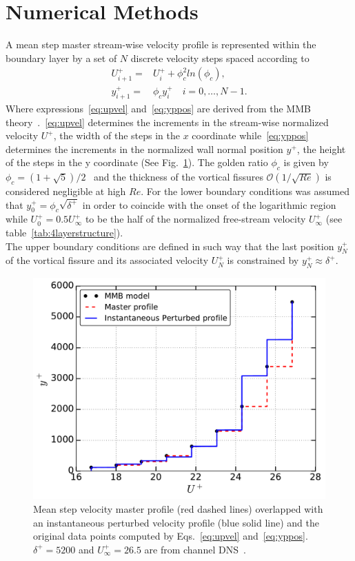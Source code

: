 \documentclass[aps,reprint,amsmath,amssymb,pra,floatfix]{revtex4-1}%
\begin{document}
\section{\label{sec:nm} Numerical Methods}
A  mean step master stream-wise velocity profile is represented within the boundary layer by a set of $N$ discrete velocity steps spaced according to  
\begin{align}
U^+_{i+1}=&U^+_i+\phi_c^2 ln(\phi_c) \label{eq:upvel},\\
y^+_{i+1}=&\phi_c y^+_i\quad i=0,\ldots ,N-1. \label{eq:yppos}
\end{align}
Where expressions~\eqref{eq:upvel} and~\eqref{eq:yppos} are derived from the MMB theory~\citep{Klewickimmb}.~\eqref{eq:upvel} determines the increments in the stream-wise normalized velocity $U^+$, the width of the steps in the $x$ coordinate while~\eqref{eq:yppos} determines the increments in the normalized wall normal position $y^+$, the height of the steps in the y coordinate (See Fig.~\ref{fig:master_profile}). The golden ratio $\phi_c$ is given by $\phi_c=(1+\sqrt{5})/2$~\cite{klewicki2014} and the thickness of the
vortical fissures $\mathcal{O}(1/\sqrt{Re})$ is considered negligible at high $Re$. For the lower boundary conditions was assumed that $y^+_0=\phi_c\sqrt{\delta^+}$ in order to coincide with the onset of the logarithmic region  while $U^+_0=0.5 U_{\infty}^+$ to be the half of the normalized free-stream velocity $U_{\infty}^+$ (see table~\ref{tab:4layerstructure}). \\  
The upper boundary conditions are defined in such way that the last position $y_{N}^+$ of the vortical fissure and its associated velocity $U^+_{N}$ is constrained by $y_{N}^+\approx\delta^+$.\\
\begin{figure}[b]
\includegraphics[scale=0.45]{figures/Master_step_profile}
\caption{\label{fig:master_profile} Mean step velocity master profile (red dashed lines) overlapped with an instantaneous perturbed velocity profile (blue solid line) and the original data points computed by Eqs.~\eqref{eq:upvel} and~\eqref{eq:yppos}. $\delta^+=5200$ and $U^+_{\infty}=26.5$ are from channel DNS~\citep{leemoser2015}.}
\end{figure} 
\end{document}
